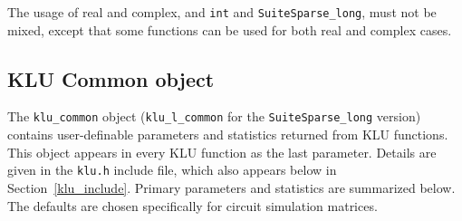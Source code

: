\documentclass[11pt]{article}
\begin{document}
The usage of real and complex, and {\tt int} and {\tt SuiteSparse\_long}, must not be
mixed, except that some functions can be used for both real and complex cases.

\subsection{KLU Common object}

The {\tt klu\_common} object ({\tt klu\_l\_common} for the {\tt SuiteSparse\_long}
version) contains user-definable parameters and statistics returned from
KLU functions.  This object appears in every KLU function as the last
parameter.  Details are given in the {\tt klu.h} include file, which also
appears below in Section~\ref{klu_include}.  Primary parameters and statistics
are summarized below.  The defaults are chosen specifically for circuit
simulation matrices.
\end{document}
